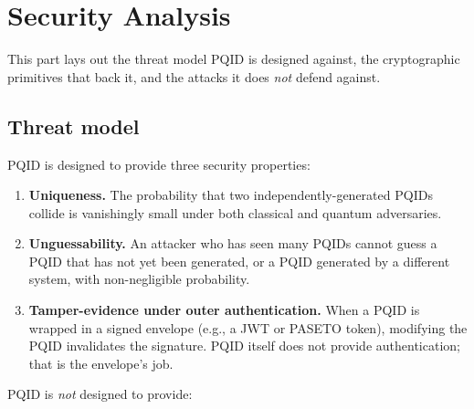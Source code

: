 \section{Security Analysis}
\label{sec:security}

This part lays out the threat model PQID is designed against, the cryptographic primitives that back it, and the attacks it does \emph{not} defend against.

\subsection{Threat model}

PQID is designed to provide three security properties:

\begin{enumerate}
  \item \textbf{Uniqueness.} The probability that two independently-generated PQIDs collide is vanishingly small under both classical and quantum adversaries.
  \item \textbf{Unguessability.} An attacker who has seen many PQIDs cannot guess a PQID that has not yet been generated, or a PQID generated by a different system, with non-negligible probability.
  \item \textbf{Tamper-evidence under outer authentication.} When a PQID is wrapped in a signed envelope (e.g., a JWT \citep{rfc7519} or PASETO \citep{paseto} token), modifying the PQID invalidates the signature. PQID itself does not provide authentication; that is the envelope's job.
\end{enumerate}

PQID is \emph{not} designed to provide:


